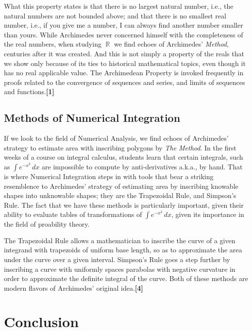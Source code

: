 \documentclass[letterpaper, 12pt]{amsart}
\DeclareMathOperator{\R}{\mathbb{R}}
\theoremstyle{definition}  %
\begin{document}
		What this property states is that there is no largest natural number, i.e., the natural numbers are not bounded above; and that there is no smallest real number, i.e., if you give me a number, I can always find another number smaller than yours.
		While Archimedes never concerned himself with the completeness of the real numbers, when studying $\R$ we find echoes of Archimedes' \textit{Method}, centuries after it was created.
		And this is not simply a property of the reals that we show only because of its ties to historical mathematical topics, even though it has no real applicable value.
		The Archimedean Property is invoked frequently in proofs related to the convergence of sequences and series, and limits of sequences and functions.\textbf{[1]}

		\subsection{Methods of Numerical Integration}
		\label{sub:methods_of_numerical_integration}
		If we look to the field of Numerical Analysis, we find echoes of Archimedes' strategy to estimate area with inscribing polygons by \textit{The Method}.
		In the first weeks of a course on integral calculus, students learn that certain integrals, such as $\int e^{-x^{2}} \, dx$ are impossible to compute by anti-derivatives a.k.a., by hand.
		That is where Numerical Integration steps in with tools that bear a striking resemblence to Archimedes' strategy of estimating area by inscribing knowable shapes into unknowable shapes; they are the Trapezoidal Rule, and Simpson's Rule.
		The fact that we have these methods is particularly important, given their ability to evaluate tables of transformations of $\int e^{-x^{2}} \, dx$, given its importance in the field of proability theory.

		The Trapezoidal Rule allows a mathematician to inscribe the curve of a given integrand with trapezoids of uniform base length, so as to approximate the area under the curve over a given interval.
		Simpson's Rule goes a step further by inscribing a curve with uniformly spaces parabolas with negative curvature in order to approximate the definite integral of the curve.
		Both of these methods are modern flavors of Archimedes' original idea.\textbf{[4]}

	\section{Conclusion}
	\label{sec:conclusion}
	\newpage
\end{document}
